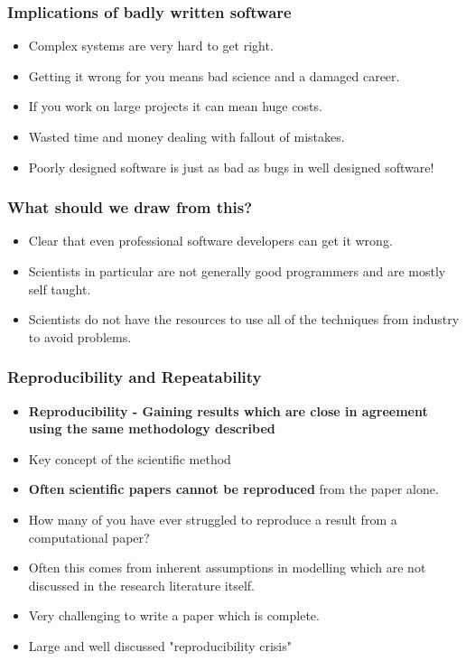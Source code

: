 \documentclass{beamer}
\begin{document}
\begin{frame}
    \frametitle{Implications of badly written software}
    \begin{itemize}
    \item Complex systems are very hard to get right.
    \item Getting it wrong for you means bad science and a damaged career.
    \item If you work on large projects it can mean huge costs.
    \item Wasted time and money dealing with fallout of mistakes.
    \item Poorly designed software is just as bad as bugs in well designed software!
    \end{itemize}
\end{frame}

\begin{frame}
    \frametitle{What should we draw from this?}
    \begin{itemize}
        \item Clear that even professional software developers can get it wrong.
        \item Scientists in particular are not generally good programmers and are mostly self taught.
        \item Scientists do not have the resources to use all of the techniques from industry to avoid problems.
    \end{itemize}
\end{frame}

\begin{frame}
    \frametitle{Reproducibility and Repeatability}
    \begin{itemize}
        \item \textbf{Reproducibility - Gaining results which are close in agreement using the same methodology described}
        \item Key concept of the scientific method
        \item \textbf{Often scientific papers cannot be reproduced} from the paper alone.
        \item How many of you have ever struggled to reproduce a result from a computational paper?
        \item Often this comes from inherent assumptions in modelling which are not discussed in the research literature itself.
        \item Very challenging to write a paper which is complete.
        \item Large and well discussed "reproducibility crisis"
    \end{itemize}
\end{frame}
\end{document}
